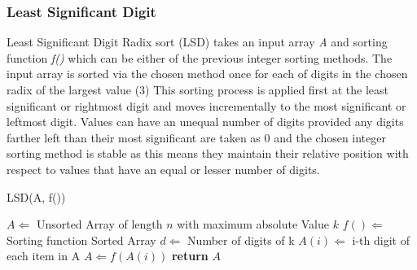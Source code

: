 \documentclass[12pt]{article}
\begin{document}
	\subsubsection{Least Significant Digit}
	Least Significant Digit Radix sort (LSD) takes an input array \textit{A} and sorting function \textit{f()} which can be either of the previous integer sorting methods. The input array is sorted via the chosen method once for each of digits in the chosen radix of the largest value (3) This sorting process is applied first at the least significant or rightmost digit and moves incrementally to the most significant or leftmost digit. Values can have an unequal number of digits provided any digits farther left than their most significant are taken as 0 and the chosen integer sorting method is stable as this means they maintain their relative position with respect to values that have an equal or lesser number of digits.
	
	\begin{algorithm} %
		\caption{LSD({A, f()})} %
		\label{alg3} %
		\begin{algorithmic}[1] %
			\REQUIRE $A \Leftarrow$ Unsorted Array of length $n$ with maximum absolute Value $k$
			\REQUIRE $f() \Leftarrow $Sorting function 
			\ENSURE Sorted Array
			\STATE $d \Leftarrow$ Number of digits of k 
			\STATE $A(i) \Leftarrow$ i-th digit of each item in A
				\STATE $A \Leftarrow f(A(i))$ 
			\ENDFOR
			\STATE \textbf{return} $A$
		\end{algorithmic}
	\end{algorithm}
	\pagebreak
\end{document}

